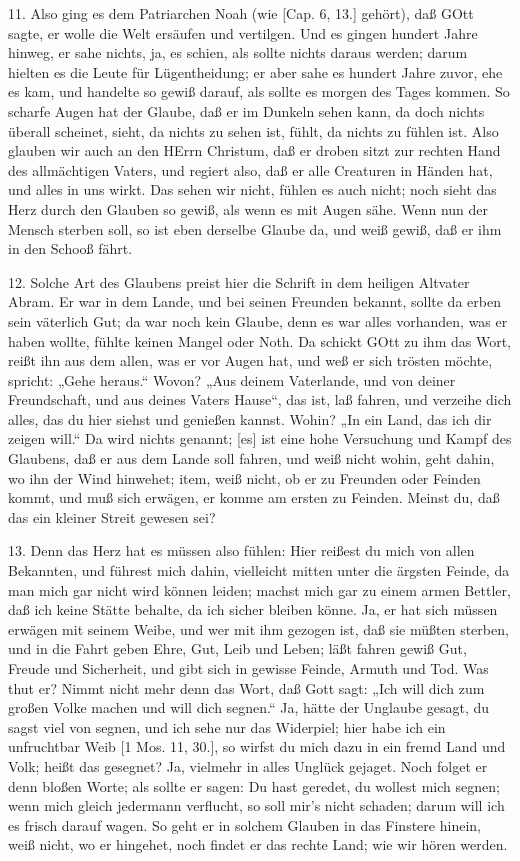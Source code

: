 11. Also ging es dem Patriarchen Noah (wie [Cap. 6, 13.] gehört), daß GOtt sagte, er wolle die Welt ersäufen und vertilgen. Und es gingen hundert Jahre hinweg, er sahe nichts, ja, es schien, als sollte nichts daraus werden; darum hielten es die Leute für Lügentheidung; er aber sahe es hundert Jahre zuvor, ehe es kam, und handelte so gewiß darauf, als sollte es morgen des Tages kommen. So scharfe Augen hat der Glaube, daß er im Dunkeln sehen kann, da doch nichts überall scheinet, sieht, da nichts zu sehen ist, fühlt, da nichts zu fühlen ist. Also glauben wir auch an den HErrn Christum, daß er droben sitzt zur rechten Hand des allmächtigen Vaters, und regiert also, daß er alle Creaturen in Händen hat, und alles in uns wirkt. Das sehen wir nicht, fühlen es auch nicht; noch sieht das Herz durch den Glauben so gewiß, als wenn es mit Augen sähe. Wenn nun der Mensch sterben soll, so ist eben derselbe Glaube da, und weiß gewiß, daß er ihm in den Schooß fährt.

12. Solche Art des Glaubens preist hier die Schrift in dem heiligen Altvater Abram. Er war in dem Lande, und bei seinen Freunden bekannt, sollte da erben sein väterlich Gut; da war noch kein Glaube, denn es war alles vorhanden, was er haben wollte, fühlte keinen Mangel oder Noth. Da schickt GOtt zu ihm das Wort, reißt ihn aus dem allen, was er vor Augen hat, und weß er sich trösten möchte, spricht: „Gehe heraus.“ Wovon? „Aus deinem Vaterlande, und von deiner Freundschaft, und aus deines Vaters Hause“, das ist, laß fahren, und verzeihe dich alles, das du hier siehst und genießen kannst. Wohin? „In ein Land, das ich dir zeigen will.“ Da wird nichts genannt; [es] ist eine hohe Versuchung und Kampf des
Glaubens, daß er aus dem Lande soll fahren, und weiß nicht wohin, geht dahin, wo ihn der Wind hinwehet; item, weiß nicht, ob er zu Freunden oder Feinden kommt, und muß sich erwägen, er komme am ersten zu Feinden. Meinst du, daß das ein kleiner Streit gewesen sei?

13. Denn das Herz hat es müssen also fühlen: Hier reißest du mich von allen Bekannten, und führest mich dahin, vielleicht mitten unter die ärgsten Feinde, da man mich gar nicht wird können leiden; machst mich gar zu einem armen Bettler, daß ich keine Stätte behalte, da ich sicher bleiben könne. Ja, er hat sich müssen erwägen mit seinem Weibe, und wer mit ihm gezogen ist, daß sie müßten sterben, und in die Fahrt geben Ehre, Gut, Leib und Leben; läßt fahren gewiß Gut, Freude und Sicherheit, und gibt sich in gewisse Feinde, Armuth und Tod. Was thut er? Nimmt nicht mehr denn das Wort, daß Gott sagt: „Ich will dich zum großen Volke machen und will dich segnen.“ Ja, hätte der Unglaube gesagt, du sagst viel von segnen, und ich sehe nur das Widerpiel; hier habe ich ein unfruchtbar Weib [1 Mos. 11, 30.], so wirfst du mich dazu in ein fremd Land und Volk; heißt das gesegnet? Ja, vielmehr in alles Unglück gejaget. Noch folget er denn bloßen Worte; als sollte er sagen: Du hast geredet, du wollest mich segnen; wenn mich gleich jedermann verflucht, so soll mir’s nicht schaden; darum will ich es frisch darauf wagen. So geht er in solchem Glauben in das Finstere hinein, weiß nicht, wo er hingehet, noch findet er das rechte Land; wie wir hören werden.

